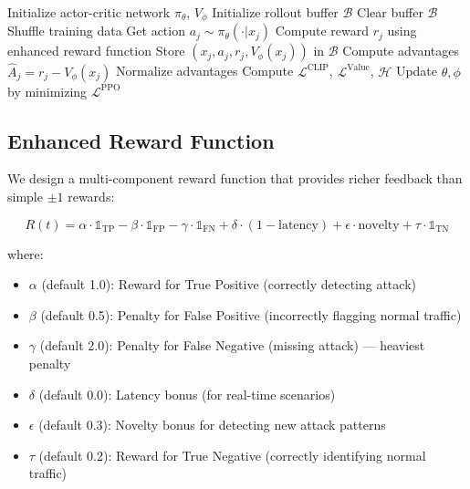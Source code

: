 \documentclass[conference]{IEEEtran}
\begin{document}
\begin{algorithm}[htbp]
\caption{PPO Training at Agent}
\begin{algorithmic}[1]
\State Initialize actor-critic network $\pi_\theta$, $V_\phi$
\State Initialize rollout buffer $\mathcal{B}$
    \State Clear buffer $\mathcal{B}$
    \State Shuffle training data
        \State Get action $a_j \sim \pi_\theta(\cdot|x_j)$
        \State Compute reward $r_j$ using enhanced reward function
        \State Store $(x_j, a_j, r_j, V_\phi(x_j))$ in $\mathcal{B}$
    \EndFor
    \State Compute advantages $\hat{A}_j = r_j - V_\phi(x_j)$
    \State Normalize advantages
            \State Compute $\mathcal{L}^{\text{CLIP}}$, $\mathcal{L}^{\text{Value}}$, $\mathcal{H}$
            \State Update $\theta, \phi$ by minimizing $\mathcal{L}^{\text{PPO}}$
        \EndFor
    \EndFor
\EndFor
\end{algorithmic}
\end{algorithm}

\subsection{Enhanced Reward Function}

We design a multi-component reward function that provides richer feedback than simple $\pm1$ rewards:

\begin{equation}
R(t) = \alpha \cdot \mathbb{1}_{\text{TP}} - \beta \cdot \mathbb{1}_{\text{FP}} - \gamma \cdot \mathbb{1}_{\text{FN}} + \delta \cdot (1 - \text{latency}) + \epsilon \cdot \text{novelty} + \tau \cdot \mathbb{1}_{\text{TN}}
\end{equation}

where:
\begin{itemize}
    \item $\alpha$ (default 1.0): Reward for True Positive (correctly detecting attack)
    \item $\beta$ (default 0.5): Penalty for False Positive (incorrectly flagging normal traffic)
    \item $\gamma$ (default 2.0): Penalty for False Negative (missing attack) --- heaviest penalty
    \item $\delta$ (default 0.0): Latency bonus (for real-time scenarios)
    \item $\epsilon$ (default 0.3): Novelty bonus for detecting new attack patterns
    \item $\tau$ (default 0.2): Reward for True Negative (correctly identifying normal traffic)
\end{itemize}
\end{document}
